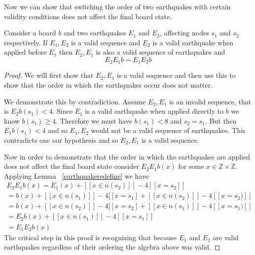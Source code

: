\documentclass[runningheads,a4paper]{llncs}
\begin{document}
Now we can show that switching the order of two earthquakes with certain validity conditions does not affect the final board state.
\begin{lemma}
\label{swappinglemma}
Consider a board $b$ and two earthquakes $E_1$ and $E_2$, affecting nodes $s_1$ and $s_2$ respectively. If $E_1, E_2$ is a valid sequence and $E_2$ is a valid earthquake when applied before $E_1$ then $E_2, E_1$ is also a valid sequence of earthquakes and 
\begin{equation*}
E_2 E_1 b = E_1 E_2 b
\end{equation*}
\end{lemma}
\begin{proof}
We will first show that $E_2, E_1$ is a valid sequence and then use this to show that the order in which the earthquakes occur does not matter. 

We demonstrate this by contradiction. Assume  $E_2, E_1$ is an invalid sequence, that is $E_2 b(s_1)<4$. Since $E_1$ is a valid earthquake when applied directly to $b$ we know $b(s_1) \geq 4 $. 
Therefore we must have $b(s_1)<8$ and $s_2=s_1$. But then $E_1 b(s_1)<4$ and so $E_1, E_2$ would not be a valid sequence of earthquakes. This contradicts one our hypothesis and so $E_2, E_1$ is a valid sequence. 

Now in order to demonstrate that the order in which the earthquakes are applied does not affect the final board state consider $E_2 E_1 b(x)$ for some $x \in \mathbb{Z} \times \mathbb{Z}$. Applying Lemma ~\ref{earthquakeredefine} we have 
\begin{align*}
E_2 E_1 b (x) = E_1(x)  + [[ x \in n(s_2) ]] - 4[[ x=s_2]] \\
= b(x) + [[ x \in n(s_1) ]] - 4[[x = s_1] + [[ x \in n(s_2) ]] - 4[[ x= s_2)]]  \\
= b(x) + [[ x \in n(s_2) ]] - 4[[x = s_2] + [[ x \in n(s_1) ]] - 4[[ x= s_1)]]\\
= E_2 b(x) + [[ x \in n(s_1) ]] - 4[[ x = s_1]] \\
= E_1 E_2 b(x) 
\end{align*}
The critical step in this proof is recognizing that because $E_1$ and $E_2$ are valid earthquakes regardless of their ordering the algebra above was valid.
\end{proof}
\end{document}
